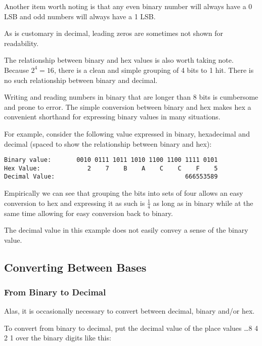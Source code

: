 Another item worth noting is that any even binary number will always
have a 0 LSB and odd numbers will always have a 1 LSB.

As is customary in decimal, leading zeros are sometimes not shown 
for readability.

The relationship between binary and hex values is also worth taking
note.  Because $2^4 = 16$, there is a clean and simple grouping
of 4 \gls{bit}s to 1 \gls{hit}.  There is no such relationship
between binary and decimal.  

Writing and reading numbers in binary that are longer than 8 bits 
is cumbersome and prone to error.  The simple conversion between 
binary and hex makes hex a convenient shorthand for expressing 
binary values in many situations.  

For example, consider the following value expressed in binary, 
hexadecimal and decimal (spaced to show the relationship
between binary and hex):

\begin{verbatim}
Binary value:       0010 0111 1011 1010 1100 1100 1111 0101
Hex Value:             2    7    B    A    C    C    F    5
Decimal Value:                                    666553589
\end{verbatim}

Empirically we can see that grouping the bits into sets of four
allows an easy conversion to hex and expressing it as such is
$\frac{1}{4}$ as long as in binary while at the same time
allowing for easy conversion back to binary.

The decimal value in this example does not easily convey a sense
of the binary value.

\subsection{Converting Between Bases}

\subsubsection{From Binary to Decimal}
\label{section:bindec}

Alas, it is occasionally necessary to convert between decimal,
binary and/or hex.

To convert from binary to decimal, put the decimal value of the place values 
{\ldots8 4 2 1} over the binary digits like this:

